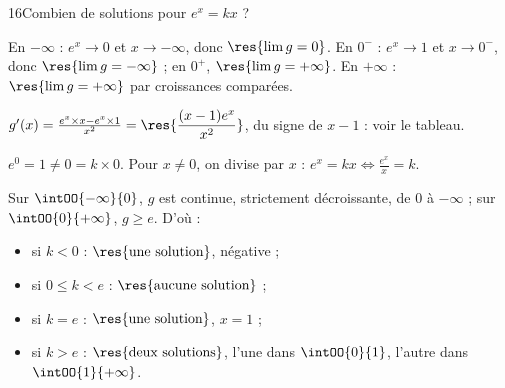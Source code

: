 \begin{corrige}{16}{Combien de solutions pour $e^{x}=kx$ ?}
\begin{questions}
  \item En $-\infty$ : $e^{x}\to0$ et $x\to-\infty$, donc $\res{\lim g=0}$. En $0^{-}$ : $e^{x}\to1$ et $x\to0^{-}$, donc $\res{\lim g=-\infty}$ ;
    en $0^{+}$, $\res{\lim g=+\infty}$. En $+\infty$ : $\res{\lim g=+\infty}$ par croissances comparées.
\end{questions}
\noindent
\begin{minipage}[t]{0.5\linewidth}\vspace{0pt}\raggedright
\begin{questions}[start=2]
  \item $g'(x)=\frac{e^{x}\times x-e^{x}\times1}{x^{2}}=\res{\dfrac{(x-1)e^{x}}{x^{2}}}$, du signe de $x-1$ : voir le tableau.
  \item $e^{0}=1\neq0=k\times0$. Pour $x\neq0$, on divise par $x$ : $e^{x}=kx\iff\frac{e^{x}}{x}=k$.
\end{questions}
\end{minipage}\hfill
\begin{minipage}[t]{0.46\linewidth}\vspace{1mm}
\centering
\begin{tableau}
\end{tableau}
\end{minipage}
\noindent
\begin{minipage}[t]{0.52\linewidth}\vspace{0pt}\raggedright
\begin{questions}[start=4]
  \item Sur $\intOO{-\infty}{0}$, $g$ est continue, strictement décroissante, de $0$ à $-\infty$ ; sur $\intOO{0}{+\infty}$, $g\geq e$. D'où :
    \begin{itemize}[label={\color{otNavy}\textbullet},leftmargin=1.2em,itemsep=0.3mm,topsep=0.5mm]
      \item si $k<0$ : $\res{\text{une solution}}$, négative ;
      \item si $0\leq k<e$ : $\res{\text{aucune solution}}$ ;
      \item si $k=e$ : $\res{\text{une solution}}$, $x=1$ ;
      \item si $k>e$ : $\res{\text{deux solutions}}$, l'une dans $\intOO{0}{1}$, l'autre dans $\intOO{1}{+\infty}$.

\end{itemize}
\end{questions}
\end{minipage}
\end{corrige}
